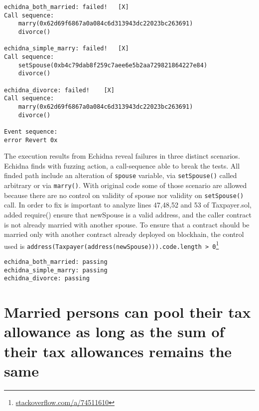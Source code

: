 \documentclass{article}
\begin{document}
\begin{verbatim}
echidna_both_married: failed!   [X]
Call sequence:
    marry(0x62d69f6867a0a084c6d313943dc22023bc263691)
    divorce()

echidna_simple_marry: failed!   [X]
Call sequence:
    setSpouse(0xb4c79dab8f259c7aee6e5b2aa729821864227e84)
    divorce()

echidna_divorce: failed!    [X]
Call sequence:
    marry(0x62d69f6867a0a084c6d313943dc22023bc263691)
    divorce()

Event sequence:
error Revert 0x
\end{verbatim} 
The execution results from Echidna reveal failures in three distinct scenarios. Echidna finds with fuzzing action, a call-sequence able to break the tests. All finded path include an alteration of \texttt{spouse} variable, via \texttt{setSpouse()} called arbitrary or via \texttt{marry()}. With original code some of those scenario are allowed because there are no control on validity of spouse nor validity on \texttt{setSpouse()} call.
In order to fix is important to analyze lines 47,48,52 and 53 of Taxpayer.sol, added require() ensure that newSpouse is a valid address, and the caller contract is not already married with another spouse.
To ensure that a contract should be married only with another contract already deployed on blockhain, the control used is \texttt{address(Taxpayer(address(newSpouse))).code.length > 0}\footnote{\href{https://stackoverflow.com/a/74511610}{stackoverflow.com/a/74511610}}
\begin{verbatim}
echidna_both_married: passing
echidna_simple_marry: passing
echidna_divorce: passing
\end{verbatim} 
 
\section{Married persons can pool their tax allowance as long as the sum of their tax allowances remains the same}
\end{document}
